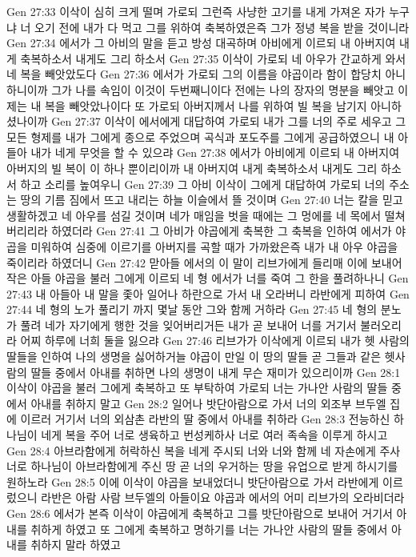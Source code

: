 Gen 27:33  이삭이 심히 크게 떨며 가로되 그런즉 사냥한 고기를 내게 가져온 자가 누구냐 너 오기 전에 내가 다 먹고 그를 위하여 축복하였은즉 그가 정녕 복을 받을 것이니라
Gen 27:34  에서가 그 아비의 말을 듣고 방성 대곡하며 아비에게 이르되 내 아버지여 내게 축복하소서 내게도 그리 하소서
Gen 27:35  이삭이 가로되 네 아우가 간교하게 와서 네 복을 빼앗았도다
Gen 27:36  에서가 가로되 그의 이름을 야곱이라 함이 합당치 아니하니이까 그가 나를 속임이 이것이 두번째니이다 전에는 나의 장자의 명분을 빼앗고 이제는 내 복을 빼앗았나이다 또 가로되 아버지께서 나를 위하여 빌 복을 남기지 아니하셨나이까
Gen 27:37  이삭이 에서에게 대답하여 가로되 내가 그를 너의 주로 세우고 그 모든 형제를 내가 그에게 종으로 주었으며 곡식과 포도주를 그에게 공급하였으니 내 아들아 내가 네게 무엇을 할 수 있으랴
Gen 27:38  에서가 아비에게 이르되 내 아버지여 아버지의 빌 복이 이 하나 뿐이리이까 내 아버지여 내게 축복하소서 내게도 그리 하소서 하고 소리를 높여우니
Gen 27:39  그 아비 이삭이 그에게 대답하여 가로되 너의 주소는 땅의 기름 짐에서 뜨고 내리는 하늘 이슬에서 뜰 것이며
Gen 27:40  너는 칼을 믿고 생활하겠고 네 아우를 섬길 것이며 네가 매임을 벗을 때에는 그 멍에를 네 목에서 떨쳐버리리라 하였더라
Gen 27:41  그 아비가 야곱에게 축복한 그 축복을 인하여 에서가 야곱을 미워하여 심중에 이르기를 아버지를 곡할 때가 가까왔은즉 내가 내 아우 야곱을 죽이리라 하였더니
Gen 27:42  맏아들 에서의 이 말이 리브가에게 들리매 이에 보내어 작은 아들 야곱을 불러 그에게 이르되 네 형 에서가 너를 죽여 그 한을 풀려하나니
Gen 27:43  내 아들아 내 말을 좇아 일어나 하란으로 가서 내 오라버니 라반에게 피하여
Gen 27:44  네 형의 노가 풀리기 까지 몇날 동안 그와 함께 거하라
Gen 27:45  네 형의 분노가 풀려 네가 자기에게 행한 것을 잊어버리거든 내가 곧 보내어 너를 거기서 불러오리라 어찌 하루에 너희 둘을 잃으랴
Gen 27:46  리브가가 이삭에게 이르되 내가 헷 사람의 딸들을 인하여 나의 생명을 싫어하거늘 야곱이 만일 이 땅의 딸들 곧 그들과 같은 헷사람의 딸들 중에서 아내를 취하면 나의 생명이 내게 무슨 재미가 있으리이까
Gen 28:1  이삭이 야곱을 불러 그에게 축복하고 또 부탁하여 가로되 너는 가나안 사람의 딸들 중에서 아내를 취하지 말고
Gen 28:2  일어나 밧단아람으로 가서 너의 외조부 브두엘 집에 이르러 거기서 너의 외삼촌 라반의 딸 중에서 아내를 취하라
Gen 28:3  전능하신 하나님이 네게 복을 주어 너로 생육하고 번성케하사 너로 여러 족속을 이루게 하시고
Gen 28:4  아브라함에게 허락하신 복을 네게 주시되 너와 너와 함께 네 자손에게 주사 너로 하나님이 아브라함에게 주신 땅 곧 너의 우거하는 땅을 유업으로 받게 하시기를 원하노라
Gen 28:5  이에 이삭이 야곱을 보내었더니 밧단아람으로 가서 라반에게 이르렀으니 라반은 아람 사람 브두엘의 아들이요 야곱과 에서의 어미 리브가의 오라비더라
Gen 28:6  에서가 본즉 이삭이 야곱에게 축복하고 그를 밧단아람으로 보내어 거기서 아내를 취하게 하였고 또 그에게 축복하고 명하기를 너는 가나안 사람의 딸들 중에서 아내를 취하지 말라 하였고
